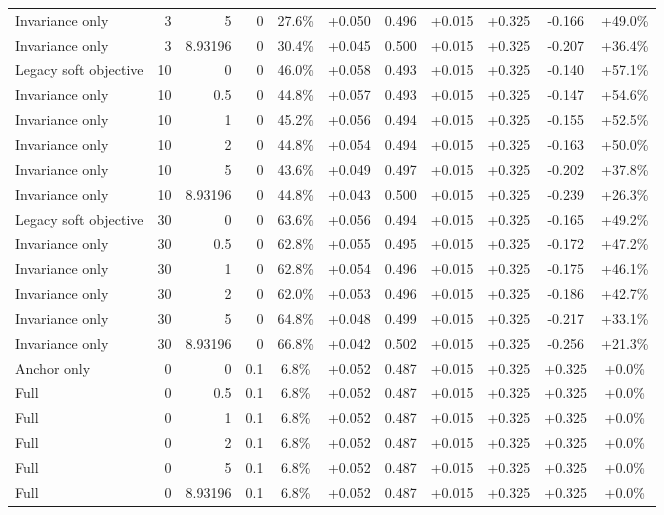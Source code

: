 \begin{table}[htbp]
\begin{tabular}{lrrrccccccc}
Invariance only & 3 & 5 & 0 & 27.6\% & +0.050 & 0.496 & +0.015 & +0.325 & -0.166 & +49.0\% \\
Invariance only & 3 & 8.93196 & 0 & 30.4\% & +0.045 & 0.500 & +0.015 & +0.325 & -0.207 & +36.4\% \\
Legacy soft objective & 10 & 0 & 0 & 46.0\% & +0.058 & 0.493 & +0.015 & +0.325 & -0.140 & +57.1\% \\
Invariance only & 10 & 0.5 & 0 & 44.8\% & +0.057 & 0.493 & +0.015 & +0.325 & -0.147 & +54.6\% \\
Invariance only & 10 & 1 & 0 & 45.2\% & +0.056 & 0.494 & +0.015 & +0.325 & -0.155 & +52.5\% \\
Invariance only & 10 & 2 & 0 & 44.8\% & +0.054 & 0.494 & +0.015 & +0.325 & -0.163 & +50.0\% \\
Invariance only & 10 & 5 & 0 & 43.6\% & +0.049 & 0.497 & +0.015 & +0.325 & -0.202 & +37.8\% \\
Invariance only & 10 & 8.93196 & 0 & 44.8\% & +0.043 & 0.500 & +0.015 & +0.325 & -0.239 & +26.3\% \\
Legacy soft objective & 30 & 0 & 0 & 63.6\% & +0.056 & 0.494 & +0.015 & +0.325 & -0.165 & +49.2\% \\
Invariance only & 30 & 0.5 & 0 & 62.8\% & +0.055 & 0.495 & +0.015 & +0.325 & -0.172 & +47.2\% \\
Invariance only & 30 & 1 & 0 & 62.8\% & +0.054 & 0.496 & +0.015 & +0.325 & -0.175 & +46.1\% \\
Invariance only & 30 & 2 & 0 & 62.0\% & +0.053 & 0.496 & +0.015 & +0.325 & -0.186 & +42.7\% \\
Invariance only & 30 & 5 & 0 & 64.8\% & +0.048 & 0.499 & +0.015 & +0.325 & -0.217 & +33.1\% \\
Invariance only & 30 & 8.93196 & 0 & 66.8\% & +0.042 & 0.502 & +0.015 & +0.325 & -0.256 & +21.3\% \\
Anchor only & 0 & 0 & 0.1 & 6.8\% & +0.052 & 0.487 & +0.015 & +0.325 & +0.325 & +0.0\% \\
Full & 0 & 0.5 & 0.1 & 6.8\% & +0.052 & 0.487 & +0.015 & +0.325 & +0.325 & +0.0\% \\
Full & 0 & 1 & 0.1 & 6.8\% & +0.052 & 0.487 & +0.015 & +0.325 & +0.325 & +0.0\% \\
Full & 0 & 2 & 0.1 & 6.8\% & +0.052 & 0.487 & +0.015 & +0.325 & +0.325 & +0.0\% \\
Full & 0 & 5 & 0.1 & 6.8\% & +0.052 & 0.487 & +0.015 & +0.325 & +0.325 & +0.0\% \\
Full & 0 & 8.93196 & 0.1 & 6.8\% & +0.052 & 0.487 & +0.015 & +0.325 & +0.325 & +0.0\% \\

\end{tabular}
\end{table}
